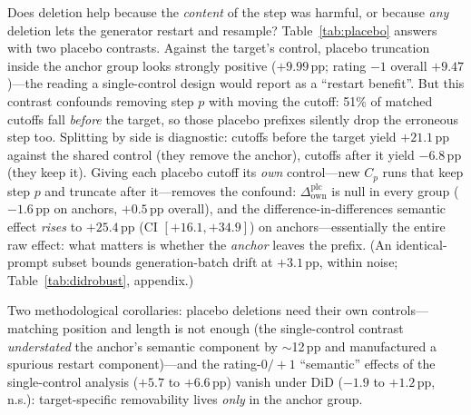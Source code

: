\documentclass[11pt]{article}
\newcommand{\ci}[2]{[#1, #2]}
\begin{document}
Does deletion help because the \emph{content} of the step was harmful, or because \emph{any} deletion lets the generator restart and resample? Table~\ref{tab:placebo} answers with two placebo contrasts. Against the target's control, placebo truncation inside the anchor group looks strongly positive ($+9.99$\,pp; rating $-1$ overall $+9.47$)---the reading a single-control design would report as a ``restart benefit''. But this contrast confounds removing step $p$ with moving the cutoff: 51\% of matched cutoffs fall \emph{before} the target, so those placebo prefixes silently drop the erroneous step too. Splitting by side is diagnostic: cutoffs before the target yield $+21.1$\,pp against the shared control (they remove the anchor), cutoffs after it yield $-6.8$\,pp (they keep it). Giving each placebo cutoff its \emph{own} control---new $C_p$ runs that keep step $p$ and truncate after it---removes the confound: $\Delta^{\mathrm{plc}}_{\mathrm{own}}$ is null in every group ($-1.6$\,pp on anchors, $+0.5$\,pp overall), and the difference-in-differences semantic effect \emph{rises} to $+25.4$\,pp (CI $\ci{+16.1}{+34.9}$) on anchors---essentially the entire raw effect: what matters is whether the \emph{anchor} leaves the prefix. (An identical-prompt subset bounds generation-batch drift at $+3.1$\,pp, within noise; Table~\ref{tab:didrobust}, appendix.)

Two methodological corollaries: placebo deletions need their own controls---matching position and length is not enough (the single-control contrast \emph{understated} the anchor's semantic component by $\sim$12\,pp and manufactured a spurious restart component)---and the rating-$0/{+}1$ ``semantic'' effects of the single-control analysis ($+5.7$ to $+6.6$\,pp) vanish under DiD ($-1.9$ to $+1.2$\,pp, n.s.): target-specific removability lives \emph{only} in the anchor group.
\end{document}
